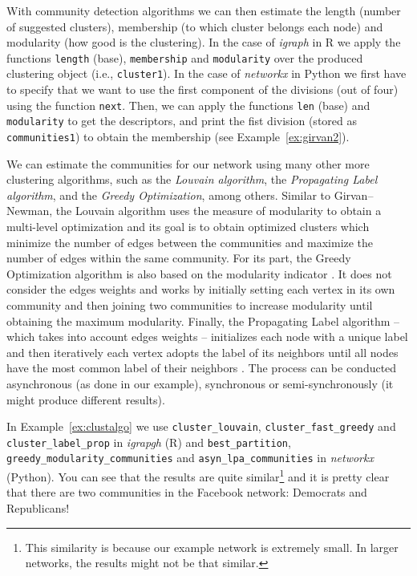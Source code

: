 With community detection algorithms we can then estimate the length (number of suggested clusters), membership (to which cluster belongs each node) and modularity (how good is the clustering). In the case of \emph{igraph} in R we apply the functions \texttt{length} (base), \texttt{membership} and \texttt{modularity} over the produced clustering object (i.e., \texttt{cluster1}). In the case of \emph{networkx} in Python we first have to specify that we want to use the first component of the divisions (out of four) using the function \texttt{next}. Then, we can apply the functions \texttt{len} (base) and \texttt{modularity} to get the descriptors, and print the fist division (stored as \texttt{communities1}) to obtain the membership (see Example~\ref{ex:girvan2}).


We can estimate the communities for our network using many other more clustering algorithms, such as the \emph{Louvain algorithm}, the \emph{Propagating Label algorithm}, and the \emph{Greedy Optimization}, among others. Similar to Girvan--Newman, the Louvain algorithm uses the measure of modularity to obtain a multi-level optimization \citep{blondel2008fast} and its goal is to obtain optimized clusters which minimize the number of edges between the communities and maximize the number of edges within the same community. For its part, the Greedy Optimization algorithm is also based on the modularity indicator \citep{clauset2004finding}. It does not consider the edges weights and works by initially setting each vertex in its own community and then joining two communities to increase modularity until obtaining the maximum modularity. Finally, the Propagating Label algorithm -- which takes into account edges weights -- initializes each node with a unique label and then iteratively each vertex adopts the label of its neighbors until all nodes have the most common label of their neighbors \citep{raghavan2007near}. The process can be conducted asynchronous (as done in our example), synchronous or semi-synchronously (it might produce different results).

In Example~\ref{ex:clustalgo} we use \texttt{cluster\_louvain}, \texttt{cluster\_fast\_greedy} and \texttt{cluster\_label\_prop} in \emph{igrapgh} (R) and \texttt{best\_partition}, \texttt{greedy\_modularity\_communities} and \texttt{asyn\_lpa\_communities} in \emph{networkx} (Python). You can see  that the results are quite similar\footnote{This similarity is because our example network is extremely small. In larger networks, the results might not be that similar.}  and it is pretty clear that there are two communities in the Facebook network: Democrats and Republicans!

